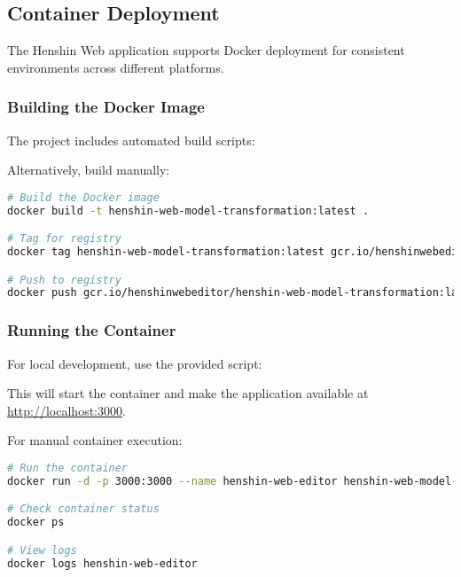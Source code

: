 \subsection{Container Deployment}
\label{subsec:deployment}

The Henshin Web application supports Docker deployment for consistent environments across different platforms.

\subsubsection{Building the Docker Image}

The project includes automated build scripts:



Alternatively, build manually:

\begin{lstlisting}[language=bash]
# Build the Docker image
docker build -t henshin-web-model-transformation:latest .

# Tag for registry
docker tag henshin-web-model-transformation:latest gcr.io/henshinwebeditor/henshin-web-model-transformation:latest

# Push to registry
docker push gcr.io/henshinwebeditor/henshin-web-model-transformation:latest
\end{lstlisting}

\subsubsection{Running the Container}

For local development, use the provided script:


This will start the container and make the application available at \url{http://localhost:3000}.

For manual container execution:

\begin{lstlisting}[language=bash]
# Run the container
docker run -d -p 3000:3000 --name henshin-web-editor henshin-web-model-transformation:latest

# Check container status
docker ps

# View logs
docker logs henshin-web-editor
\end{lstlisting}

